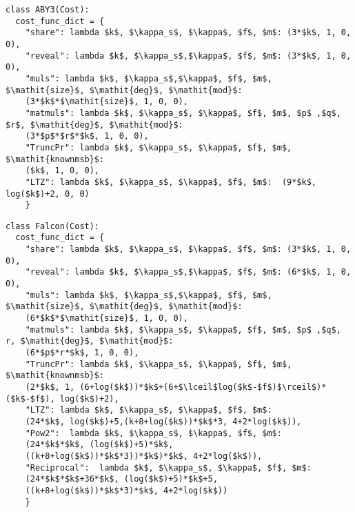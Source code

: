 \begin{lstlisting}[mathescape,xleftmargin=2em,framexleftmargin=2em, caption = {Communication cost configuration for basic operations of \texttt{ABY3}~\cite{mohassel2018aby3}.}, columns=fullflexible, label = {list:aby3_cost}]
class ABY3(Cost):
  cost_func_dict = {
    "share": lambda $k$, $\kappa_s$, $\kappa$, $f$, $m$: (3*$k$, 1, 0, 0),
    "reveal": lambda $k$, $\kappa_s$,$\kappa$, $f$, $m$: (3*$k$, 1, 0, 0),
    "muls": lambda $k$, $\kappa_s$,$\kappa$, $f$, $m$, $\mathit{size}$, $\mathit{deg}$, $\mathit{mod}$: 
    (3*$k$*$\mathit{size}$, 1, 0, 0),
    "matmuls": lambda $k$, $\kappa_s$, $\kappa$, $f$, $m$, $p$ ,$q$, $r$, $\mathit{deg}$, $\mathit{mod}$: 
    (3*$p$*$r$*$k$, 1, 0, 0),
    "TruncPr": lambda $k$, $\kappa_s$, $\kappa$, $f$, $m$, $\mathit{knownmsb}$:
    ($k$, 1, 0, 0),    
    "LTZ": lambda $k$, $\kappa_s$, $\kappa$, $f$, $m$:  (9*$k$, log($k$)+2, 0, 0) 
    }
\end{lstlisting}

\begin{lstlisting}[mathescape,xleftmargin=2em,framexleftmargin=2em, caption = {Communication cost configuration for basic operations of \texttt{Falcon}~\cite{wagh2020falcon}.}, columns=fullflexible, label = {list:falcon_cost}]
class Falcon(Cost):
  cost_func_dict = {
    "share": lambda $k$, $\kappa_s$, $\kappa$, $f$, $m$: (3*$k$, 1, 0, 0),
    "reveal": lambda $k$, $\kappa_s$,$\kappa$, $f$, $m$: (6*$k$, 1, 0, 0),
    "muls": lambda $k$, $\kappa_s$,$\kappa$, $f$, $m$, $\mathit{size}$, $\mathit{deg}$, $\mathit{mod}$: 
    (6*$k$*$\mathit{size}$, 1, 0, 0),
    "matmuls": lambda $k$, $\kappa_s$, $\kappa$, $f$, $m$, $p$ ,$q$, r, $\mathit{deg}$, $\mathit{mod}$: 
    (6*$p$*r*$k$, 1, 0, 0),
    "TruncPr": lambda $k$, $\kappa_s$, $\kappa$, $f$, $m$, $\mathit{knownmsb}$: 
    (2*$k$, 1, (6+log($k$))*$k$+(6+$\lceil$log($k$-$f$)$\rceil$)*($k$-$f$), log($k$)+2),    
    "LTZ": lambda $k$, $\kappa_s$, $\kappa$, $f$, $m$:  
    (24*$k$, log($k$)+5,(k+8+log($k$))*$k$*3, 4+2*log($k$)),
    "Pow2":  lambda $k$, $\kappa_s$, $\kappa$, $f$, $m$:  
    (24*$k$*$k$, (log($k$)+5)*$k$, 
    ((k+8+log($k$))*$k$*3))*$k$)*$k$, 4+2*log($k$)),
    "Reciprocal":  lambda $k$, $\kappa_s$, $\kappa$, $f$, $m$:  
    (24*$k$*$k$+36*$k$, (log($k$)+5)*$k$+5, 
    ((k+8+log($k$))*$k$*3)*$k$, 4+2*log($k$))
    }
\end{lstlisting}

